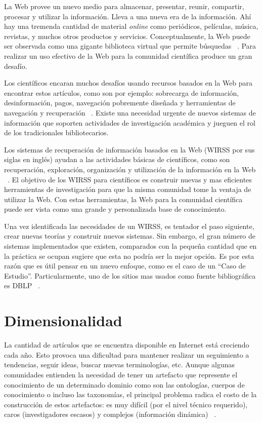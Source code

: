 \documentclass[12pt,oneside,letterpaper]{book}
\newcommand{\eng}[1]{\textit{#1}\xspace}			%
\newcommand{\abr}[1]{\textsc{#1}\xspace}           %
\theoremstyle{definition}
\begin{document}
La Web provee un nuevo medio para almacenar, presentar, reunir, compartir, procesar y utilizar la información. Lleva a una nueva era de la información. Ahí hay una tremenda cantidad de material \eng{online} como periódicos, películas, música, revistas, y muchos otros productos y servicios. Conceptualmente, la Web puede ser observada como una gigante biblioteca virtual que permite búsquedas ~\cite{saunders1993}. Para realizar un uso efectivo de la Web para la comunidad científica produce un gran desafío.

Los científicos encaran muchos desafíos usando recursos basados en la Web para encontrar estos artículos, como son por ejemplo: sobrecarga de información, desinformación, pagos, navegación pobremente diseñada y herramientas de navegación y recuperación ~\cite{hoggan2002}. Existe una necesidad urgente de nuevos sistemas de información que soporten actividades de investigación académica y jueguen el rol de los tradicionales bibliotecarios.

Los sistemas de recuperación de información basados en la Web (\abr{WIRSS} por sus siglas en inglés) ayudan a las actividades básicas de científicos, como son recuperación, exploración, organización y utilización de la información en la Web ~\cite{yao2003web,yao2002information}. El objetivo de los \abr{WIRSS} para científicos es construir nuevas y mas eficientes herramientas de investigación para que la misma comunidad tome la ventaja de utilizar la Web. Con estas herramientas, la Web para la comunidad científica puede ser vista como una grande y personalizada base de conocimiento.

Una vez identificada las necesidades de un \abr{WIRSS}, es tentador el paso siguiente, crear nuevas teorías y construir nuevos sistemas. Sin embargo, el gran número de sistemas implementados que existen, comparados con la pequeña cantidad que en la práctica se ocupan sugiere que esta no podría ser la mejor opción. Es por esta razón que es útil pensar en un nuevo enfoque, como es el caso de un ``Caso de Estudio''. Particularmente, uno de los sitios mas usados como fuente bibliográfica es \abr{DBLP} ~\cite{yin2013case}.  

\section{Dimensionalidad}
\label{sec:dimensionalidad}
La cantidad de artículos que se encuentra disponible en Internet está creciendo cada año. Esto provoca una dificultad para mantener realizar un seguimiento a tendencias, seguir ideas, buscar nuevas terminologías, etc. Aunque algunas comunidades entienden la necesidad de tener un artefacto que represente el conocimiento de un determinado dominio como son las ontologías, cuerpos de conocimiento o incluso las taxonomías, el principal problema radica el costo de la construcción de estos artefactos: es muy difícil (por el nivel técnico requerido), caros (investigadores escasos) y  complejos (información dinámica) ~\cite{codocedo2011cheating}.
\end{document}
